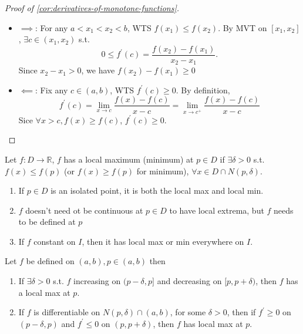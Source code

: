 \begin{proof}[Proof of 
    \ref{cor:derivatives-of-monotone-functions}
]
\begin{itemize}
    \item $\implies$: For any $a < x_1 < x_2 < b$, 
    WTS $f(x_1) \leq f(x_2)$. 
    By MVT on $[x_1, x_2]$, $\exists c \in (x_1, x_2)$ s.t. 
    \[
        0 \leq f^{\prime}(c) = \frac{f(x_2) - f(x_1)}{x_2 - x_1}.
    \]
    Since $x_2 - x_1 > 0$, we have $f(x_2) - f(x_1) \geq 0$
    \item $\impliedby$: Fix any $c \in (a, b)$, WTS $f^{\prime}(c) \geq 0$.
    By definition,
    \[
        f^{\prime}(c)
        = \lim_{x \to c} \frac{f(x) - f(c)}{x - c}
        = \lim_{x \to c^+} \frac{f(x) - f(c)}{x - c}
    \]
    Sice $\forall x > c, f(x) \geq f(c)$, $f^{\prime}(c) \geq 0$.
\end{itemize} 
\end{proof}

\begin{definition}
    Let $f: D \to \mathbb{R}$, $f$ has a local maximum (minimum)
    at $p \in D$ if $\exists \delta > 0$ s.t. 
    $f(x) \leq f(p)$ 
    (or $f(x) \geq f(p)$ for minimum), $\forall x \in D \cap N (p,\delta)$.
\end{definition}

\begin{remark}
    \begin{enumerate}
        \item If $p \in D$ is an isolated point, it is both the local max
        and local min. 
        \item $f$ doesn't need ot be continuous at $p \in D$ to have local
        extrema, but $f$ needs to be defined at $p$
        \item If $f$ constant on $I$, then it has local max or min everywhere
        on $I$.
    \end{enumerate} 
\end{remark}

\begin{corollary}
    Let $f$ be defined on $(a, b), p \in (a, b)$ then 
    \begin{enumerate}
        \item If $\exists \delta > 0$ s.t. $f$ increasing on $(p- \delta, p]$
        and decreasing on $[p, p +\delta)$, then $f$ has a local max at $p$. 
        \item If $f$ is differentiable on $N(p, \delta) \cap (a, b)$, for 
        some $\delta > 0$, then if $f^{\prime} \geq 0$ on $(p - \delta, p)$
        and $f^{\prime} \leq 0$ on $(p, p + \delta)$, then 
        $f$ has local max at $p$.
    \end{enumerate} 
\end{corollary}

















